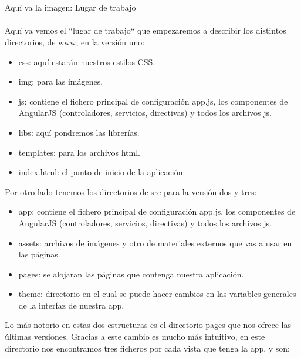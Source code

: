 \documentclass[a4paper, 11pt]{article}
\begin{document}
\begin{itemize}
            \\\\\textcolor[rgb]{1,0,0}{Aquí va la imagen: Lugar de trabajo}\\\\

            Aquí ya vemos el ``lugar de trabajo`` que empezaremos a describir los
            distintos directorios, de www, en la versión uno:

            \begin{itemize}
                  \item{css: aquí estarán nuestros estilos CSS.}
                  \item{img: para las imágenes.}
                  \item{js: contiene el fichero principal de configuración app.js,
                        los componentes de AngularJS (controladores, servicios,
                        directivas) y todos los archivos js.}
                  \item{libs: aquí pondremos las librerías.}
                  \item{templates: para los archivos html.}
                  \item{index.html: el punto de inicio de la aplicación.}
            \end{itemize}

            Por otro lado tenemos los directorios de src para la versión dos y tres:

            \begin{itemize}
                  \item{app: contiene el fichero principal de configuración app.js,
                        los componentes de AngularJS (controladores, servicios,
                        directivas) y todos los archivos js.}
                  \item{assets: archivos de imágenes y otro de materiales externos
                        que vas a usar en las páginas.}
                  \item{pages: se alojaran las páginas que contenga nuestra
                        aplicación.}
                  \item{theme: directorio en el cual se puede hacer cambios en las
                        variables generales de la interfaz de nuestra app.}
            \end{itemize}

            Lo más notorio en estas dos estructuras es el directorio pages que nos
            ofrece las últimas versiones. Gracias a este cambio es mucho más
            intuitivo, en este directorio nos encontramos tres ficheros por cada
            vista que tenga la app, y son:


\end{itemize}
\end{document}
